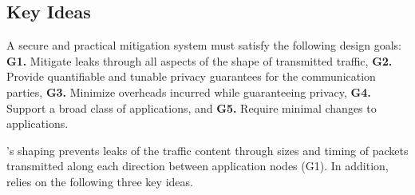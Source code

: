 \subsection{Key Ideas}
\label{subsec:key-ideas}

A secure and practical {\nsca} mitigation system must satisfy the following
design goals:
{\bf G1.} Mitigate leaks through all aspects of the shape of transmitted traffic,
{\bf G2.} Provide quantifiable and tunable privacy guarantees for the
communication parties,
{\bf G3.} Minimize overheads incurred while guaranteeing privacy,
{\bf G4.} Support a broad class of applications, and
{\bf G5.} Require minimal changes to applications.

{\sys}'s shaping prevents leaks of the traffic content through sizes and
timing of packets transmitted along each direction between application nodes
(G1).
In addition, {\sys} relies on the following three key ideas.
%

